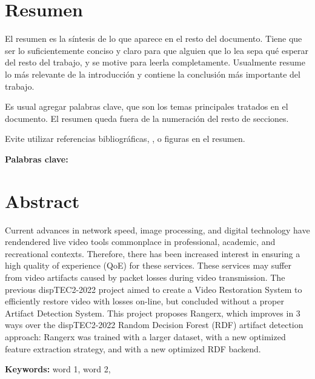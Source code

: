 \chapter*{Resumen}
\thispagestyle{empty}

El resumen es la síntesis de lo que aparece en el resto del
documento. Tiene que ser lo suficientemente conciso y claro para que
alguien que lo lea sepa qué esperar del resto del trabajo, y se motive
para leerla completamente.  Usualmente resume lo más relevante de la
introducción y contiene la conclusión más importante del trabajo.

Es usual agregar palabras clave, que son los temas principales
tratados en el documento. El resumen queda fuera de la numeración del
resto de secciones.

Evite utilizar referencias bibliográficas, \tablas, o figuras en el
resumen.

\bigskip

\textbf{Palabras clave:} \thesisKeywords

\clearpage
\chapter*{Abstract}
\thispagestyle{empty}

Current advances in network speed, image processing, and digital technology have rendendered live video tools commonplace in professional, academic, and recreational contexts. Therefore, there has been increased interest in ensuring a high quality of experience (QoE) for these services. These services may suffer from video artifacts caused by packet losses during video transmission. The previous dispTEC2-2022 project aimed to create a Video Restoration System to efficiently restore video with losses on-line, but concluded without a proper Artifact Detection System. This project proposes Rangerx, which improves in 3 ways over the dispTEC2-2022 Random Decision Forest (RDF) artifact detection approach: Rangerx was trained with a larger dataset, with a new optimized feature extraction strategy, and with a new optimized RDF backend.

\bigskip

\textbf{Keywords:} word 1, word 2, 

\cleardoublepage


